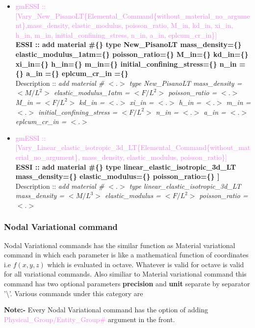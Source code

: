 \documentclass[11pt]{article}
\begin{document}
\begin{itemize}
    \item \textcolor{violet}{gmESSI :: [Vary\_New\_PisanoLT\{Elemental\_Command\{without\_material\_no\_argument\},mass\_density, elastic\_modulus, poisson\_ratio, M\_in, kd\_in, xi\_in, h\_in, m\_in, initial\_confining\_stress, n\_in, a\_in, eplcum\_cr\_in\}]}\\
    \textbf{ESSI :: add material \#\{\} type New\_PisanoLT mass\_density=\{\} elastic\_modulus\_1atm=\{\} poisson\_ratio=\{\} M\_in=\{\} kd\_in=\{\} xi\_in=\{\} h\_in=\{\} m\_in=\{\} initial\_confining\_stress=\{\} n\_in =\{\} a\_in =\{\} eplcum\_cr\_in =\{\}}\\
    Description ::  \textit{ add material \# $<.>$ type New\_PisanoLT  mass\_density = $<M/L^2>$ elastic\_modulus\_1atm = $<F/L^2>$ poisson\_ratio = $<.>$ M\_in = $<F/L^2>$ kd\_in = $<.>$ xi\_in = $<.>$ h\_in = $<.>$ m\_in = $<.>$ initial\_confining\_stress = $<F/L^2>$ n\_in = $<.>$ a\_in = $<.>$ eplcum\_cr\_in = $<.>$} 

    \item \textcolor{violet}{gmESSI :: [Vary\_Linear\_elastic\_isotropic\_3d\_LT\{Elemental\_Command\{without\_material\_no\_argument\}, mass\_density, elastic\_modulus, poisson\_ratio\}]}\\
    \textbf{ESSI :: add material \#\{\} type linear\_elastic\_isotropic\_3d\_LT mass\_density=\{\} elastic\_modulus=\{\} poisson\_ratio=\{\} ]}\\
    Description ::  \textit{ add material \# $<.>$ type linear\_elastic\_isotropic\_3d\_LT mass\_density = $<M/L^3>$ elastic\_modulus = $<F/L^2>$ poisson\_ratio = $<.>$} 

  \end{itemize}

\subsubsection{Nodal Variational command}
Nodal Variational commands has the similar function as Material variational command 
in which each parameter is like a mathematical function of coordinates i.e $f(x,y,z)$ 
which is evaluated in octave. Whatever is valid for octave is valid for all variational 
commands. Also similiar to Material variational command 
this command has two optional parameters \textbf{precision} and \textbf{unit} separate 
by separator '\textbackslash'. Various commands under this category are 

\noindent \textbf{Note:-} Every Nodal Variational command has the option of adding
\textcolor{violet}{Physical_Group/Entity_Group\#} argument in the front.
\end{document}

